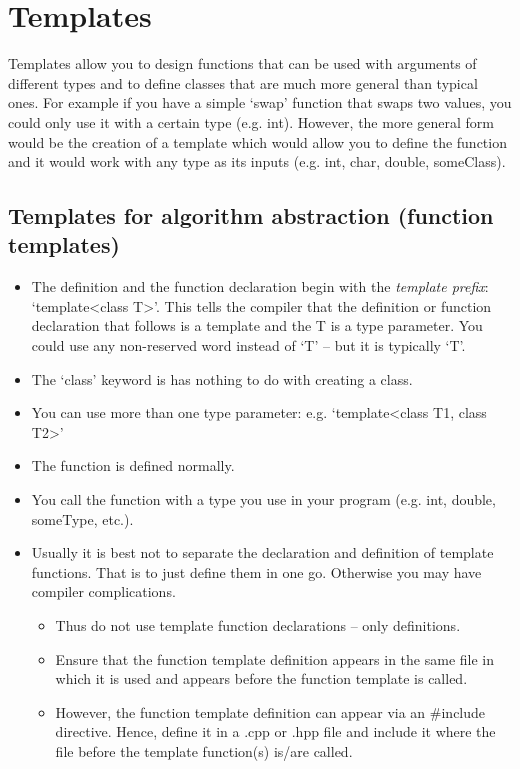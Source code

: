 \section{Templates}

Templates allow you to design functions that can be used with arguments of different types
and to define classes that are much more general than typical ones. For example if you have
a simple `swap' function that swaps two values, you could only use it with a certain type (e.g. int).
However, the more general form would be the creation of a template which would allow you to
define the function and it would work with any type as its inputs (e.g. int, char, double, someClass).

\subsection{Templates for algorithm abstraction (function templates)}

\begin{itemize}
	\item The definition and the function declaration begin with the \emph{template prefix}: `template<class T>'.
	This tells the compiler that the definition or function declaration that follows is a template and the T is
	a type parameter. You could use any non-reserved word instead of `T' -- but it is typically `T'.
	\item The `class' keyword is has nothing to do with creating a class.
	\item You can use more than one type parameter: e.g. `template<class T1, class T2>'
	\item The function is defined normally.
	\item You call the function with a type you use in your program (e.g. int, double, someType, etc.).
	\item Usually it is best not to separate the declaration and definition of template functions. That is to
	just define them in one go. Otherwise you may have compiler complications.
	\begin{itemize}
		\item Thus do not use template function declarations -- only definitions.
		\item Ensure that the function template definition appears in the same file in which it
		is used and appears before the function template is called.
		\item However, the function template definition can appear via an \#include directive.
		Hence, define it in a .cpp or .hpp file and include it where the file before the template
		function(s) is/are called.
	\end{itemize}
\end{itemize}

